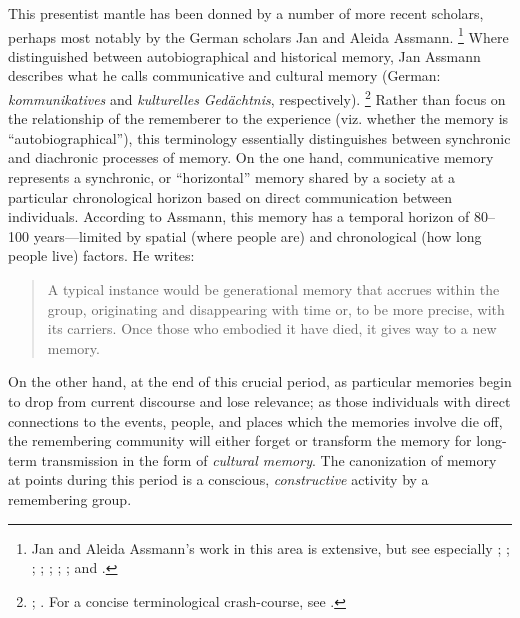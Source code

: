 This presentist mantle has been donned by a number of more recent scholars, perhaps most notably by the German scholars Jan and Aleida Assmann.%
    \footnote{%
        Jan and Aleida Assmann's work in this area is extensive, but see especially 
        \cite{a_assmann_poltermann1995}; 
        \cite{a_assmann2011};
        \cite{assmann_nikulin2015}; 
        \cite{assmann2014};
        \cite{assmann2011};
        \cite{assmann_erllnunning2008};
        \cite{assmann2006}; and
        \cite{assmannassmann_merten-etal1994}.}
Where \halbwachs distinguished between autobiographical and historical memory, Jan Assmann describes what he calls communicative and cultural memory (German: \emph{kommunikatives} and \emph{kulturelles} \emph{Gedächtnis}, respectively).%
    \footnote{%
        \Cite[36]{assmann2011};
        \cite{assmann_erllnunning2008}.
        For a concise terminological crash-course, see
        \cite[182--183]{hubenthal_carstens-hasselbalch2012}.}
Rather than focus on the relationship of the rememberer to the experience (viz. whether the memory is ``autobiographical''), this terminology essentially distinguishes between synchronic and diachronic processes of memory. On the one hand, communicative memory represents a synchronic, or ``horizontal'' memory shared by a society at a particular chronological horizon based on direct communication between individuals. According to Assmann, this memory has a temporal horizon of 80--100 years---limited by spatial (where people are) and chronological (how long people live) factors. He writes:  

\begin{quote}
    A typical instance would be generational memory that accrues within the group, originating and disappearing with time or, to be more precise, with its carriers. Once those who embodied it have died, it gives way to a new memory.%
        \autocite[36]{assmann2011} 
\end{quote}  
\noindent
On the other hand, at the end of this crucial period, as particular memories begin to drop from current discourse and lose relevance; as those individuals with direct connections to the events, people, and places which the memories involve die off, the remembering community will either forget or transform the memory for long-term transmission in the form of \emph{cultural memory}. The canonization of memory at points during this period is a conscious, \emph{constructive} activity by a remembering group.%
    \autocite[45]{assmann2011}  

